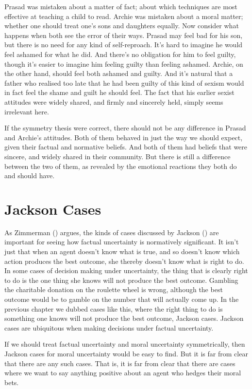 \documentclass[
  10pt,
  letterpaper,
  twoside]{scrbook}
\begin{document}
{Prasad} was mistaken about a matter of fact; about which techniques are
most effective at teaching a child to read. {Archie} was mistaken about
a moral matter; whether one should treat one's sons and daughters
equally. Now consider what happens when both see the error of their
ways. {Prasad} may feel bad for his son, but there is no need for any
kind of self-reproach. It's hard to imagine he would feel ashamed for
what he did. And there's no obligation for him to feel guilty, though
it's easier to imagine him feeling guilty than feeling ashamed.
{Archie}, on the other hand, should feel both ashamed and guilty. And
it's natural that a father who realised too late that he had been guilty
of this kind of sexism would in fact feel the shame and guilt he should
feel. The fact that his earlier sexist attitudes were widely shared, and
firmly and sincerely held, simply seems irrelevant here.

If the symmetry thesis were correct, there should not be any difference
in {Prasad} and {Archie}'s attitudes. Both of them behaved in just the
way we should expect, given their factual and normative beliefs. And
both of them had beliefs that were sincere, and widely shared in their
community. But there is still a difference between the two of them, as
revealed by the emotional reactions they both do and should have.

\section{Jackson Cases}\label{jacksoncases}

As Zimmerman () argues, the kinds of
cases discussed by Jackson () are
important for seeing how factual uncertainty is normatively significant.
It isn't just that when an agent doesn't know what is true, and so
doesn't know which action produces the best outcome, she thereby doesn't
know what is right to do. In some cases of decision making under
uncertainty, the thing that is clearly right to do is the one thing she
knows will not produce the best outcome. Gambling the charitable
donation on the roulette wheel is wrong, although the best outcome would
be to gamble on the number that will actually come up. In the previous
chapter we dubbed cases like this, where the right thing to do is
something one knows will not produce the best outcome, Jackson cases.
Jackson cases are ubiquitous when making decisions under factual
uncertainty.

If we should treat factual uncertainty and moral uncertainty
symmetrically, then Jackson cases for moral uncertainty would be easy to
find. But it is far from clear that there are any such cases. That is,
it is far from clear that there are cases where we want to say anything
positive about an agent who hedges their moral bets.
\end{document}
